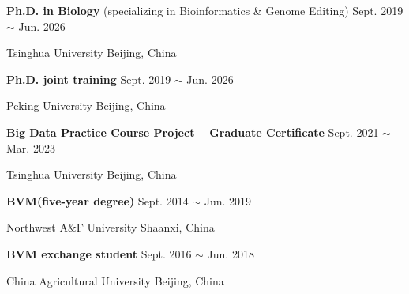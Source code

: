 

\renewcommand{\thefootnote}{\fnsymbol{footnote}}
\setcounter{footnote}{0}
    \textbf{Ph.D. in Biology\footnotemark[1]} (specializing in Bioinformatics \& Genome Editing) \hfill Sept. 2019 $\sim$ Jun. 2026\footnotemark[2]

    Tsinghua University \hfill Beijing, China
    
    \textbf{Ph.D. joint training\footnotemark[1]} \hfill Sept. 2019 $\sim$ Jun. 2026\footnotemark[2]
    
    Peking University \hfill Beijing, China

    \textbf{Big Data Practice Course Project -- Graduate Certificate} \hfill Sept. 2021 $\sim$ Mar. 2023
    
    Tsinghua University \hfill Beijing, China

    \textbf{BVM\footnotemark[3] (five-year degree)} \hfill Sept. 2014 $\sim$ Jun. 2019
    
    Northwest A\&F University \hfill Shaanxi, China

    \textbf{BVM exchange student} \hfill Sept. 2016 $\sim$ Jun. 2018
    
    China Agricultural University \hfill Beijing, China

\renewcommand{\thefootnote}{\arabic{footnote}}
\setcounter{footnote}{1}
